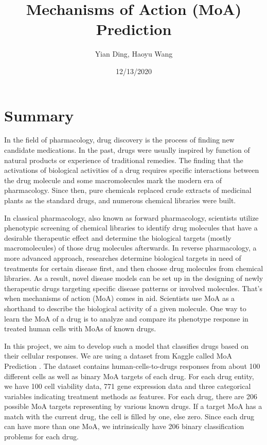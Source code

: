 \documentclass[11.5pt]{article}
\title{Mechanisms of Action (MoA) Prediction}
\author{Yian Ding, Haoyu Wang}
\date{12/13/2020}
\begin{document}
\maketitle


\vspace{2mm}
\section{Summary}
In the field of pharmacology, drug discovery is the process of finding new candidate medications. In the past, drugs were usually inspired by function of natural products or experience of traditional remedies. The finding that the activations of biological activities of a drug requires specific interactions between the drug molecule and some macromolecules mark the modern era of pharmacology. Since then, pure chemicals replaced crude extracts of medicinal plants as the standard drugs, and numerous chemical libraries were built.

In classical pharmacology, also known as forward pharmacology, scientists utilize phenotypic screening of chemical libraries to identify drug molecules that have a desirable therapeutic effect and determine the biological targets (mostly macromolecules) of those drug molecules afterwards. In reverse pharmacology, a more advanced approach, researches determine biological targets in need of treatments for certain disease first, and then choose drug molecules from chemical libraries. As a result, novel disease models can be set up in the designing of newly therapeutic drugs targeting specific disease patterns or involved molecules. That’s when mechanisms of action (MoA) comes in aid. Scientists use MoA as a shorthand to describe the biological activity of a given molecule. One way to learn the MoA of a drug is to analyze and compare its phenotype response in treated human cells with MoAs of known drugs.

In this project, we aim to develop such a model that classifies drugs based on their cellular responses. We are using a dataset from Kaggle called MoA Prediction \cite{moa}. The dataset contains human-cells-to-drugs responses from about 100 different cells as well as binary MoA targets of each drug. For each drug entity, we have 100 cell viability data, 771 gene expression data and three categorical variables indicating treatment methods as features. For each drug, there are 206 possible MoA targets representing by various known drugs. If a target MoA has a match with the current drug, the cell is filled by one, else zero. Since each drug can have more than one MoA, we intrinsically have 206 binary classification problems for each drug. 
\end{document}
